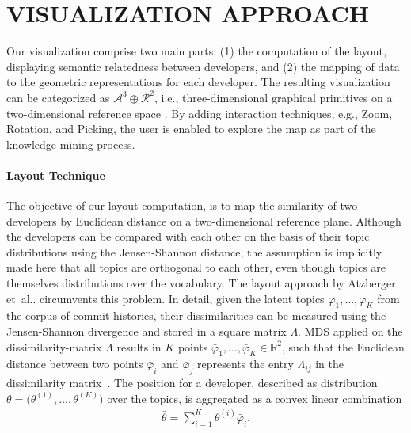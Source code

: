 \documentclass[a4paper,twoside]{article}
\makeatletter
\DeclareRobustCommand\onedot{\futurelet\@let@token\@onedot}
\def\@onedot{\ifx\@let@token.\else.\null\fi\xspace}
\def\etal{et~al\onedot\xspace}
\def\ie{i.e.,\xspace}
\def\eg{e.g.,\xspace}
\makeatother
\begin{document}
\section{\uppercase{Visualization Approach}}
\label{KM:Sec:VisualizationApproach}

\noindent Our visualization comprise two main parts: (1) the computation of the layout, displaying semantic relatedness between developers, and (2) the mapping of data to the geometric representations for each developer.
The resulting visualization can be categorized as $\mathcal{A}^3 \oplus \mathcal{R}^2$, \ie three-dimensional graphical primitives on a two-dimensional reference space \cite{duebel2014-2d3drepresentation}.
By adding interaction techniques, \eg Zoom, Rotation, and Picking, the user is enabled to explore the map as part of the knowledge mining process.

\paragraph{Layout Technique}
\label{KH:SubSec:Layout}

The objective of our layout computation, is to map the similarity of two developers by Euclidean distance on a two-dimensional reference plane.
Although the developers can be compared with each other on the basis of their topic distributions using the Jensen-Shannon distance, the assumption is implicitly made here that all topics are orthogonal to each other, even though topics are themselves distributions over the vocabulary.
The layout approach by Atzberger \etal circumvents this problem.
In detail, given the latent topics $\varphi_1, \dots, \varphi_K$ from the corpus of commit histories, their dissimilarities can be measured using the Jensen-Shannon divergence and stored in a square matrix $\Lambda$.
\ac{MDS} applied on the dissimilarity-matrix $\Lambda$ results in $K$ points $\bar{\varphi}_1, \dots, \bar{\varphi}_K \in \mathbb{R}^2$, such that the Euclidean distance between two points $\bar{\varphi}_i$ and $\bar{\varphi}_j$ represents the entry $\Lambda_{ij}$ in the dissimilarity matrix~\cite{cox2008multidimensional}.
The position for a developer, described as distribution $\theta = \Big( \theta^{(1)}, \dots, \theta^{(K)} \Big)$ over the topics, is aggregated as a convex linear combination
\begin{align}
    \bar{\theta} = \sum \limits_{i=1}^{K} \theta^{(i)} \bar{\varphi}_i.
\end{align}
\end{document}
